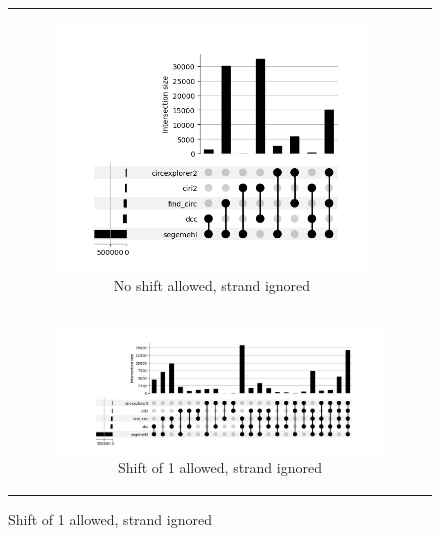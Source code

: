 \begin{figure}[ht]
\begin{tabular}{cc}
\begin{subfigure}{.5\textwidth}
                       \includegraphics[width=\linewidth]{chapters/4_results_and_discussion/figures/detection/upset/diff_0_nostrand.png}
                       \caption{No shift allowed, strand ignored}
                       \label{fig:detection_upset_0_nostrand} \end{subfigure}
               \\ \multicolumn{2}{c}{
                   \begin{subfigure}{\textwidth} \centering

                           \includegraphics[width=\linewidth]{chapters/4_results_and_discussion/figures/detection/upset/diff_1_nostrand.png}
                           \caption{Shift of 1 allowed, strand ignored}
                           \label{fig:detection_upset_1_nostrand}


\end{subfigure}}
\end{tabular}
\end{figure}
